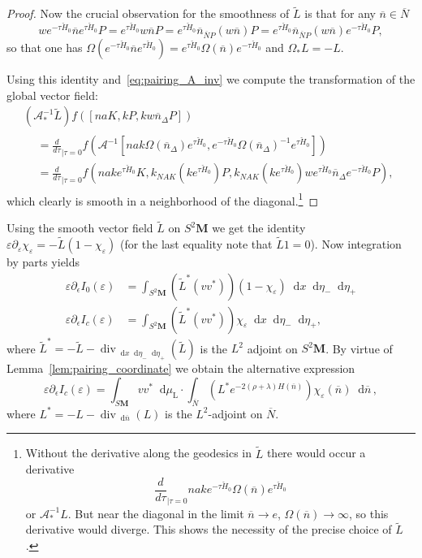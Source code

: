 \documentclass[10pt]{amsart}
\theoremstyle{definition}
\DeclareMathOperator{\Div}{div}
\newcommand{\rml}{\mathrm{L}}
\newcommand{\til}{\widetilde}
\newcommand{\intd}{\mathop{}\!\mathrm{d}}
\newcommand{\bn}{{\overline{n}}}
\newcommand{\bN}{{\overline{N}}}
\newcommand{\cH}{{\check{H}_0}}
\begin{document}
\begin{proof}
Now the crucial observation for the smoothness of $\til L$ is that for any $\bn\in\bN$
\[
we^{-\tau\cH}\bn e^{\tau\cH}P=e^{\tau\cH}w\bn P=e^{\tau\cH}\bn_{\bN P}(w\bn) P= e^{\tau\cH}\bn_{\bN P}(w\bn)e^{-\tau \cH} P,
\]
so that one has $\Omega(e^{-\tau\cH}\bn e^{\tau\cH})=e^{\tau\cH}\Omega(\bn) e^{-\tau\cH}$ and $\Omega_*L=-L$.

Using this identity and~\eqref{eq:pairing_A_inv} we compute the transformation of the global vector field:
\begin{multline}\label{eq:L_near_diag}
\left(\mathcal A^{-1}_*\til L\right) f([naK, kP, kw\bn_\Delta P])\\
\begin{aligned}
&=\frac{d}{d\tau}_{|\tau=0}f\left(\mathcal A^{-1}\left[nak\Omega(\bn_\Delta) e^{\tau\cH}, e^{-\tau\cH}\Omega(\bn_\Delta)^{-1} e^{\tau \cH}\right]\right)\\
&= \frac{d}{d\tau}_{|\tau=0} f\left(nake^{\tau\check H_0}K, k_{NAK}\left(ke^{\tau\cH}\right)P, k_{NAK}\left(ke^{\tau\cH}\right)we^{\tau\cH} \bn_\Delta e^{-\tau\cH}P\right),
\end{aligned}
\end{multline}
which clearly is smooth in a neighborhood of the diagonal.\footnote{Without the derivative along the geodesics in $\til L$ there would occur a derivative
\[
\frac{d}{d\tau}_{|\tau=0} nake^{-\tau\cH}\Omega(\bn) e^{\tau\cH}
\] 
or $\mathcal A^{-1}_*L$. But near the diagonal in the limit $\bn\to e$, $\Omega(\bn)\to\infty$, so this derivative would diverge. This shows the necessity of the precise choice of $\til L$.}
\end{proof}

Using the smooth vector field $\til L$ on $S^2\mathbf M$ we get the identity $\varepsilon\partial_\varepsilon \chi_\varepsilon = -\til L(1-\chi_\varepsilon)$ (for the last equality note that $\til L1=0$). Now integration by parts yields
\begin{equation}\label{eq:partical_int}
\begin{aligned}
\varepsilon\partial_\epsilon I_0(\varepsilon) &= \int_{S^2\mathbf M} \left(\til L^*(vv^*)\right)(1-\chi_\varepsilon)
\intd x\intd \eta_-\intd \eta_+ 
\\
\varepsilon\partial_\epsilon I_c(\varepsilon) &= \int_{S^2\mathbf M} \left(\til L^*(vv^*)\right)\chi_\varepsilon
\intd x\intd \eta_-\intd \eta_+,
\end{aligned}
\end{equation}
where $\til L^*=-\til{L}-\Div_{\intd x\intd\eta_-\intd\eta_+}(\til L)$ is the $L^2$ adjoint on $S^2\mathbf M$. By virtue of Lemma~\ref{lem:pairing_coordinate} we obtain the alternative expression 
\[
\varepsilon\partial_\epsilon I_c(\varepsilon) =
\int_{S\mathbf M} vv^*\intd\mu_{\rml} \cdot\int_{\bN} \left(L^* e^{-2(\rho+\lambda)H(\bn)}\right)
\chi_\varepsilon(\bn)\intd \bn\,,
\]
where $L^*=-L-\Div_{\intd\bn}(L)$ is the $L^2$-adjoint on $\bN$.
\end{document}
